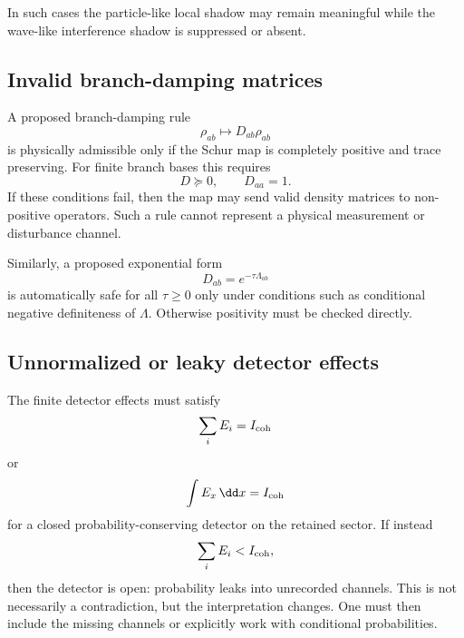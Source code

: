 \documentclass[11pt]{article}
\begin{document}
In such cases the particle-like local shadow may remain meaningful while the wave-like
interference shadow is suppressed or absent.

\subsection{Invalid branch-damping matrices}
\label{subsec:failure-invalid-D}

A proposed branch-damping rule
\begin{equation}
  \rho_{ab}\mapsto D_{ab}\rho_{ab}
\end{equation}
is physically admissible only if the Schur map is completely positive and trace preserving.
For finite branch bases this requires
\begin{equation}
  D\succeq0,
  \qquad
  D_{aa}=1.
\end{equation}
If these conditions fail, then the map may send valid density matrices to non-positive
operators. Such a rule cannot represent a physical measurement or disturbance channel.

Similarly, a proposed exponential form
\begin{equation}
  D_{ab}=e^{-\tau\Lambda_{ab}}
\end{equation}
is automatically safe for all \(\tau\ge0\) only under conditions such as conditional negative
definiteness of \(\Lambda\). Otherwise positivity must be checked directly.

\subsection{Unnormalized or leaky detector effects}
\label{subsec:failure-povm}

The finite detector effects must satisfy
\begin{equation}
  \sum_i E_i=I_{\rm coh}
\end{equation}
or
\begin{equation}
  \int E_x\,\dd x=I_{\rm coh}
\end{equation}
for a closed probability-conserving detector on the retained sector. If instead
\begin{equation}
  \sum_i E_i<I_{\rm coh},
\end{equation}
then the detector is open: probability leaks into unrecorded channels. This is not necessarily
a contradiction, but the interpretation changes. One must then include the missing channels
or explicitly work with conditional probabilities.
\end{document}
